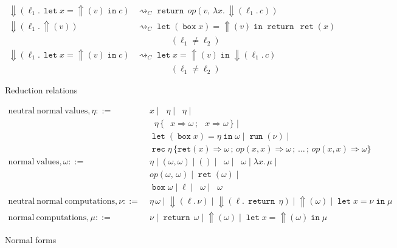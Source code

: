 \documentclass[acmsmall, screen, review, anonymous]{acmart}
\theoremstyle{definition}
\newcommand{\reflectname}{\mathord{\Uparrow}}
\newcommand{\performraw}[2]{\mathop{\reflectname(#1(#2))}}
\newcommand{\perform}[3]{\performraw{#1}{#2}(#3)}
\newcommand{\reifyname}{\Downarrow}
\newcommand{\reify}[2]{\mathop{\reifyname}(#1.\,#2)}
\newcommand{\loc}{\ell}
\newcommand{\outlname}{\mathtt{out}_L}
\newcommand{\outl}[1]{\mathop{\outlname} #1}
\newcommand{\outrname}{\mathtt{out}_R}
\newcommand{\outr}[1]{\mathop{\outrname} #1}
\newcommand{\indintro}[3]{{#1}(#2,\, #3)}
\newcommand{\retname}{\mathtt{ret}}
\newcommand{\ret}[1]{\mathop{\retname}(#1)}
\newcommand{\indelimname}{\mathtt{rec}}
\newcommand{\indelim}[2]{\mathop{\indelimname} #1 \,\{#2\}}
\newcommand{\indretcase}[2]{\retname(#1) \Rightarrow #2}
\newcommand{\indcase}[4]{#1(#2, #3) \Rightarrow #4}
\newcommand{\seq}{\,;\,}
\newcommand{\fstname}{\mathop{\pi_1}}
\newcommand{\fst}[1]{\fstname #1}
\newcommand{\sndname}{\mathop{\pi_2}}
\newcommand{\snd}[1]{\sndname #1}
\newcommand{\inlname}{\mathop{\mathtt{in}_L}}
\newcommand{\inl}[1]{\inlname #1}
\newcommand{\inrname}{\mathop{\mathtt{in}_R}}
\newcommand{\inr}[1]{\inrname #1}
\newcommand{\casename}{\mathtt{case}}
\newcommand{\casemname}{\casename^{m}}
\newcommand{\casem}[5]{\mathop{\casemname} #1 \,\{\,\inl{#2} \Rightarrow #3 \seq \inr{#4} \Rightarrow #5 \,\}}
\newcommand{\abs}[2]{\lambda#1.\,#2}
\newcommand{\app}[2]{#1\,#2}
\newcommand{\returnname}{\mathop{\mathtt{return}}}
\newcommand{\return}[1]{\returnname\, #1}
\newcommand{\letvname}{\mathop{\mathtt{let}}}
\newcommand{\letv}[3]{\letvname #1 = #2 \mathop{\mathtt{in}} #3}
\newcommand{\gboxname}{\mathop{\mathtt{box}}}
\newcommand{\gbox}[1]{\gboxname #1}
\newcommand{\gunbox}[3]{\mathop{\mathtt{let}} (\gbox{#1}) = #2 \mathop{\mathtt{in}} #3}
\newcommand{\grunname}{\mathtt{run}}
\newcommand{\grun}[1]{\mathop{\grunname}(#1)}
\newcommand{\stepstoname}{\rightsquigarrow}
\newcommand{\stepstoc}{\stepstoname_C}
\begin{document}
\begin{figure}
\begin{align*}
\reify{\loc_1}{\letv{x}{\perform{\loc_1}{op}{v}}{c}} &\stepstoc \return{\indintro{op}{v}{\abs{x}{\reify{\loc_1}{c}}}} \\
\reify{\loc_1}{\perform{\loc_2}{op}{v}} &\stepstoc \letv{(\gbox{x})}{\perform{\loc_2}{op}{v}}{\return{\ret{x}}} \\
  &\qquad \qquad (\loc_1 \neq \loc_2) \\
\reify{\loc_1}{\letv{x}{\perform{\loc_2}{op}{v}}{c}} &\stepstoc \letv{x}{\perform{\loc_2}{op}{v}}{\reify{\loc_1}{c}} \\
  &\qquad \qquad (\loc_1 \neq \loc_2)
\end{align*}
\caption{Reduction relations}
\label{fig:reduction}
\end{figure}
\begin{figure}
\begin{align*}
  \mathrm{neutral\ normal\ values}, \eta ::=\;& x \mid \fst{\eta} \mid \snd{\eta} \mid \\
                                   &\casem{\eta}{x}{\omega}{x}{\omega} \mid \\
                                   &\gunbox{x}{\eta}{\omega} \mid \grun{\nu} \mid \\
                                   &\indelim{\eta}
                                     {\indretcase{x}{\omega} \seq
                                     \indcase{op}{x}{x}{\omega} \seq \ldots \seq
                                     \indcase{op}{x}{x}{\omega}} \\
  \mathrm{normal\ values}, \omega ::=\;& \eta \mid (\omega, \omega)
                           \mid () \mid \inl{\omega} \mid \inr{\omega} \mid \abs{x}{\mu} \mid \\
                           &\indintro{op}{\omega}{\omega} \mid \ret{\omega} \mid \\
                           &\gbox{\omega} \mid \loc \mid \outl{\omega} \mid \outr{\omega} \\
  \mathrm{neutral\ normal\ computations}, \nu ::=\;& \app{\eta}{\omega}
                                            \mid \reify{\loc}{\nu} \mid \reify{\loc}{\return{\eta}} \mid \perform{\eta}{op}{\omega}
                                            \mid \letv{x}{\nu}{\mu} \\
  \mathrm{normal\ computations}, \mu ::=\;& \nu \mid \return{\omega} \mid \perform{\loc}{op}{\omega}
                                              \mid \letv{x}{\perform{\loc}{op}{\omega}}{\mu}
\end{align*}
\caption{Normal forms}
\label{fig:normal}
\end{figure}
\end{document}

